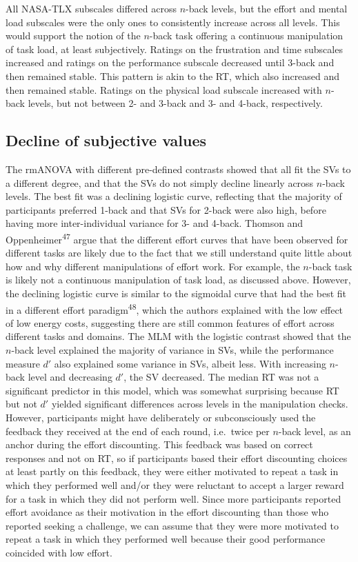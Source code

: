 \documentclass[
  man,floatsintext]{apa6}
\begin{document}
All NASA-TLX subscales differed across \(n\)-back levels, but the effort and mental load subscales were the only ones to consistently increase across all levels.
This would support the notion of the \(n\)-back task offering a continuous manipulation of task load, at least subjectively.
Ratings on the frustration and time subscales increased and ratings on the performance subscale decreased until 3-back and then remained stable.
This pattern is akin to the RT, which also increased and then remained stable.
Ratings on the physical load subscale increased with \(n\)-back levels, but not between 2- and 3-back and 3- and 4-back, respectively.

\hypertarget{decline-of-subjective-values-1}{%
\subsection{Decline of subjective values}\label{decline-of-subjective-values-1}}

The rmANOVA with different pre-defined contrasts showed that all fit the SVs to a different degree, and that the SVs do not simply decline linearly across \(n\)-back levels.
The best fit was a declining logistic curve, reflecting that the majority of participants preferred 1-back and that SVs for 2-back were also high, before having more inter-individual variance for 3- and 4-back.
Thomson and Oppenheimer\textsuperscript{47} argue that the different effort curves that have been observed for different tasks are likely due to the fact that we still understand quite little about how and why different manipulations of effort work.
For example, the \(n\)-back task is likely not a continuous manipulation of task load, as discussed above.
However, the declining logistic curve is similar to the sigmoidal curve that had the best fit in a different effort paradigm\textsuperscript{48}, which the authors explained with the low effect of low energy costs, suggesting there are still common features of effort across different tasks and domains.
The MLM with the logistic contrast showed that the \(n\)-back level explained the majority of variance in SVs, while the performance measure \(d'\) also explained some variance in SVs, albeit less.
With increasing \(n\)-back level and decreasing \(d'\), the SV decreased.
The median RT was not a significant predictor in this model, which was somewhat surprising because RT but not \(d'\) yielded significant differences across levels in the manipulation checks.
However, participants might have deliberately or subconsciously used the feedback they received at the end of each round, i.e.~twice per \(n\)-back level, as an anchor during the effort discounting.
This feedback was based on correct responses and not on RT, so if participants based their effort discounting choices at least partly on this feedback, they were either motivated to repeat a task in which they performed well and/or they were reluctant to accept a larger reward for a task in which they did not perform well.
Since more participants reported effort avoidance as their motivation in the effort discounting than those who reported seeking a challenge, we can assume that they were more motivated to repeat a task in which they performed well because their good performance coincided with low effort.
\end{document}
